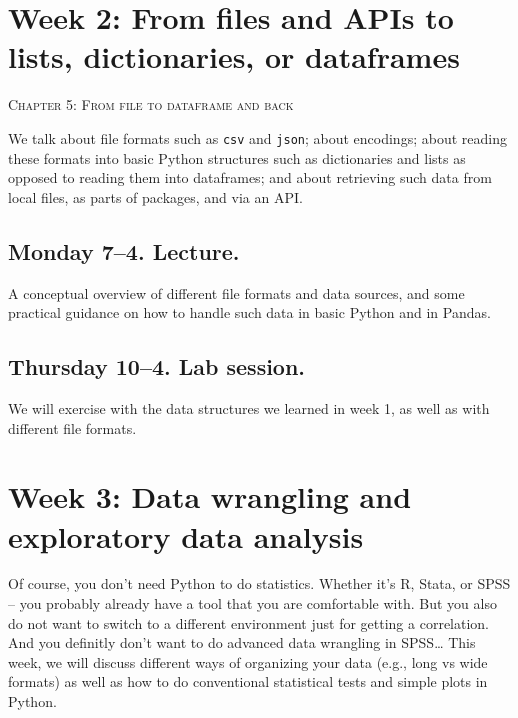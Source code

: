 
\section*{Week 2: From files and APIs to lists, dictionaries, or dataframes}
\textsc{ Chapter 5: From file to dataframe and back}\\
\textsc{  \cite{freelon_computational_2018}}

We talk about file formats such as \texttt{csv} and \texttt{json}; about encodings; about reading these formats into basic Python structures such as dictionaries and lists as opposed to reading them into dataframes; and about retrieving such data from local files, as parts of packages, and via an API.


\subsection*{Monday 7--4. Lecture.}

A conceptual overview of different file formats and data sources, and some practical guidance on how to handle such data in basic Python and in Pandas.

\subsection*{Thursday 10--4. Lab session.}

We will exercise with the data structures we learned in week 1, as well as with different file formats.


\section*{Week 3: Data wrangling and exploratory data analysis}

Of course, you don't need Python to do statistics. Whether it's R, Stata, or SPSS -- you probably already have a tool that you are comfortable with. But you also do not want to switch to a different environment just for getting a correlation. And you definitly don't want to do advanced data wrangling in SPSS\ldots
This week, we will discuss different ways of organizing your data (e.g., long vs wide formats) as well as how to do conventional statistical tests and simple plots in Python.

